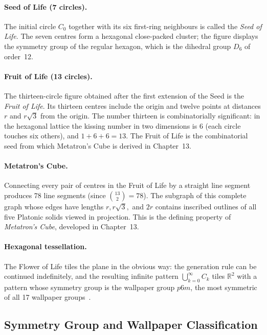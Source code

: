 \paragraph{Seed of Life (7 circles).}
The initial circle \(C_0\) together with its six first-ring neighbours is
called the \emph{Seed of Life}.  The seven centres form a hexagonal
close-packed cluster; the figure displays the symmetry group of the
regular hexagon, which is the dihedral group \(D_6\) of order~12.

\paragraph{Fruit of Life (13 circles).}
The thirteen-circle figure obtained after the first extension of the Seed
is the \emph{Fruit of Life}.  Its thirteen centres include the origin and
twelve points at distances \(r\) and \(r\sqrt{3}\) from the origin.
The number thirteen is combinatorially significant: in the hexagonal lattice
the kissing number in two dimensions is 6 (each circle touches six others),
and \(1 + 6 + 6 = 13\).  The Fruit of Life is the combinatorial seed from
which Metatron's Cube is derived in Chapter~13.

\paragraph{Metatron's Cube.}
Connecting every pair of centres in the Fruit of Life by a straight line
segment produces 78 line segments (since \(\binom{13}{2}=78\)).
The subgraph of this complete graph whose edges have lengths
\(r, r\sqrt{3},\) and \(2r\) contains inscribed outlines of all five
Platonic solids viewed in projection.  This is the defining property of
\emph{Metatron's Cube}, developed in Chapter~13.

\paragraph{Hexagonal tessellation.}
The Flower of Life tiles the plane in the obvious way: the generation rule
can be continued indefinitely, and the resulting infinite pattern
\(\bigcup_{k=0}^{\infty} C_k\) tiles \(\mathbb{R}^2\) with a pattern
whose symmetry group is the wallpaper group \(p6m\), the most symmetric
of all 17 wallpaper groups~\cite{coxeter_intro_geometry}.

\subsection{Symmetry Group and Wallpaper Classification}
\label{subsec:fol-symmetry}

